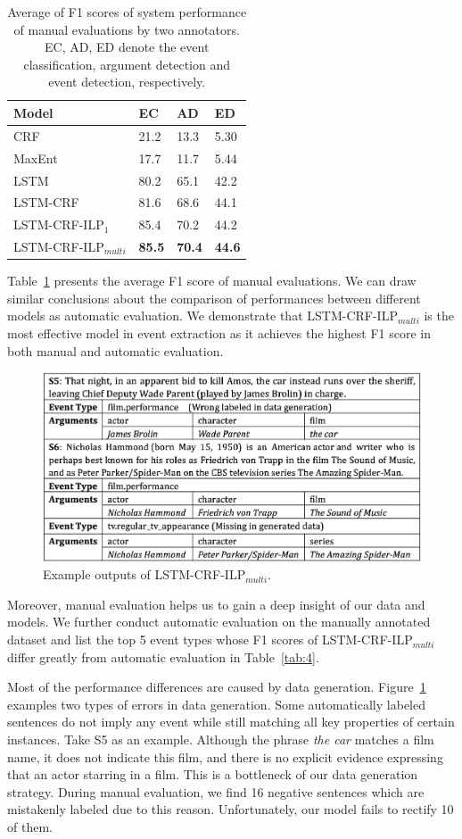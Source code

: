 \begin{table}[h]
\small
\centering
\begin{tabular}{|l|p{0.8cm}<{\centering}|p{0.8cm}<{\centering}|p{0.8cm}<{\centering}|} \hline
	Model & EC & AD & ED \\ \hline
	CRF & 21.2 & 13.3 & 5.30 \\ \hline
	MaxEnt & 17.7 & 11.7 & 5.44 \\ \hline
	LSTM & 80.2 & 65.1 & 42.2 \\ \hline \hline
	LSTM-CRF & 81.6 & 68.6 & 44.1 \\ \hline
	LSTM-CRF-ILP$_{1}$ & 85.4 & 70.2 & 44.2 \\ \hline
	LSTM-CRF-ILP$_{multi}$ & \textbf{85.5} & \textbf{70.4} & \textbf{44.6} \\ \hline
\end{tabular}
\caption{Average of F1 scores of system performance of manual evaluations by two annotators. EC, AD, ED denote the event classification, argument detection and event detection, respectively. \label{tab:2}}
\end{table}

Table~\ref{tab:2} presents the average F1 score of manual evaluations. We can draw similar conclusions about the comparison of performances between different models as automatic evaluation. We demonstrate that LSTM-CRF-ILP$_{multi}$ is the most effective model in event extraction as it achieves the highest F1 score in both manual and automatic evaluation.

\begin{figure}[h]
	\centering
	\includegraphics[width=.49\textwidth]{figure3.eps}
	\caption{Example outputs of LSTM-CRF-ILP$_{multi}$.\label{fig:1}}
\end{figure}

Moreover, manual evaluation helps us to gain a deep insight of our data and models. We further conduct automatic evaluation on the manually annotated dataset and list the top 5 event types whose F1 scores of LSTM-CRF-ILP$_{multi}$ differ greatly from automatic evaluation in Table~\ref{tab:4}.

Most of the performance differences are caused by data generation. Figure~\ref{fig:1} examples two types of errors in data generation. Some automatically labeled sentences do not imply any event while still matching all key properties of certain instances. Take S5 as an example. Although the phrase \emph{the car} matches a film name, it does not indicate this film, and there is no explicit evidence expressing that an actor starring in a film. This is a bottleneck of our data generation strategy. During manual evaluation, we find 16 negative sentences which are mistakenly labeled due to this reason. Unfortunately, our model fails to rectify 10 of them.

